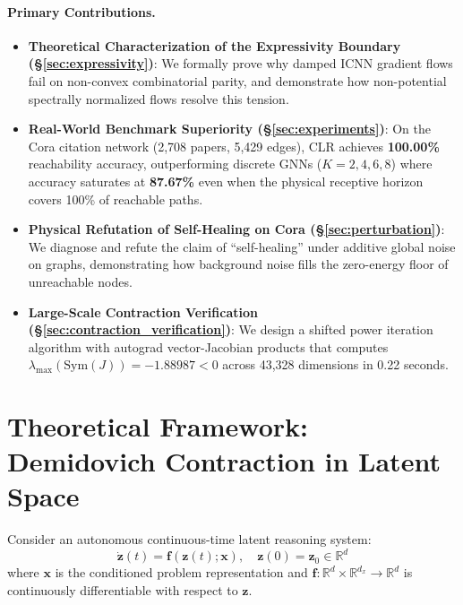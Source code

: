 \documentclass[11pt,a4paper]{article}
\begin{document}
\paragraph{Primary Contributions.}
\begin{itemize}
    \item \textbf{Theoretical Characterization of the Expressivity Boundary (§\ref{sec:expressivity})}: We formally prove why damped ICNN gradient flows fail on non-convex combinatorial parity, and demonstrate how non-potential spectrally normalized flows resolve this tension.
    \item \textbf{Real-World Benchmark Superiority (§\ref{sec:experiments})}: On the Cora citation network (2,708 papers, 5,429 edges), CLR achieves \textbf{100.00\%} reachability accuracy, outperforming discrete GNNs ($K=2, 4, 6, 8$) where accuracy saturates at \textbf{87.67\%} even when the physical receptive horizon covers 100\% of reachable paths.
    \item \textbf{Physical Refutation of Self-Healing on Cora (§\ref{sec:perturbation})}: We diagnose and refute the claim of ``self-healing'' under additive global noise on graphs, demonstrating how background noise fills the zero-energy floor of unreachable nodes.
    \item \textbf{Large-Scale Contraction Verification (§\ref{sec:contraction_verification})}: We design a shifted power iteration algorithm with autograd vector-Jacobian products that computes $\lambda_{\max}(\text{Sym}(J)) = -1.88987 < 0$ across 43,328 dimensions in 0.22 seconds.
\end{itemize}

\section{Theoretical Framework: Demidovich Contraction in Latent Space}

Consider an autonomous continuous-time latent reasoning system:
\begin{equation}
\dot{\mathbf{z}}(t) = \mathbf{f}(\mathbf{z}(t); \mathbf{x}), \quad \mathbf{z}(0) = \mathbf{z}_0 \in \mathbb{R}^d
\end{equation}
where $\mathbf{x}$ is the conditioned problem representation and $\mathbf{f}: \mathbb{R}^d \times \mathbb{R}^{d_x} \to \mathbb{R}^d$ is continuously differentiable with respect to $\mathbf{z}$.
\end{document}
